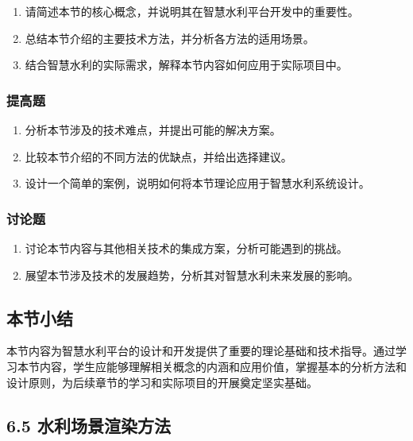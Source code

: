 \begin{enumerate}
\def\labelenumi{\arabic{enumi}.}
\tightlist
\item
  请简述本节的核心概念，并说明其在智慧水利平台开发中的重要性。
\item
  总结本节介绍的主要技术方法，并分析各方法的适用场景。
\item
  结合智慧水利的实际需求，解释本节内容如何应用于实际项目中。
\end{enumerate}

\hypertarget{ux63d0ux9ad8ux9898-5}{%
\subsubsection{提高题}\label{ux63d0ux9ad8ux9898-5}}

\begin{enumerate}
\def\labelenumi{\arabic{enumi}.}
\tightlist
\item
  分析本节涉及的技术难点，并提出可能的解决方案。
\item
  比较本节介绍的不同方法的优缺点，并给出选择建议。
\item
  设计一个简单的案例，说明如何将本节理论应用于智慧水利系统设计。
\end{enumerate}

\hypertarget{ux8ba8ux8bbaux9898-5}{%
\subsubsection{讨论题}\label{ux8ba8ux8bbaux9898-5}}

\begin{enumerate}
\def\labelenumi{\arabic{enumi}.}
\tightlist
\item
  讨论本节内容与其他相关技术的集成方案，分析可能遇到的挑战。
\item
  展望本节涉及技术的发展趋势，分析其对智慧水利未来发展的影响。
\end{enumerate}

\hypertarget{ux672cux8282ux5c0fux7ed3-4}{%
\subsection{本节小结}\label{ux672cux8282ux5c0fux7ed3-4}}

本节内容为智慧水利平台的设计和开发提供了重要的理论基础和技术指导。通过学习本节内容，学生应能够理解相关概念的内涵和应用价值，掌握基本的分析方法和设计原则，为后续章节的学习和实际项目的开展奠定坚实基础。

\hypertarget{ux6c34ux5229ux573aux666fux6e32ux67d3ux65b9ux6cd5}{%
\subsection{6.5 水利场景渲染方法}\label{ux6c34ux5229ux573aux666fux6e32ux67d3ux65b9ux6cd5}}

